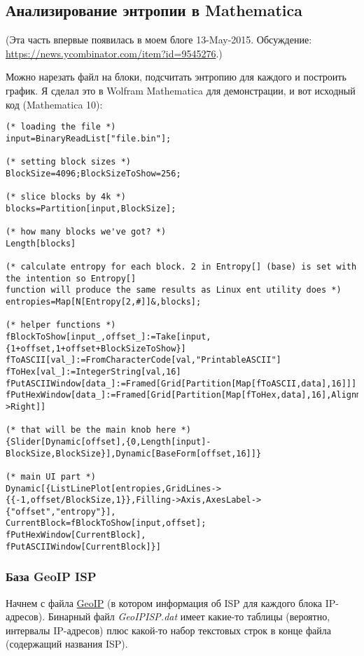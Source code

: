 \subsection{Анализирование энтропии в Mathematica}
\newcommand{\EntropyGfxScale}{0.8\textwidth}

(Эта часть впервые появилась в моем блоге 13-May-2015.
Обсуждение: \url{https://news.ycombinator.com/item?id=9545276}.)

Можно нарезать файл на блоки, подсчитать энтропию для каждого и построить график.
Я сделал это в Wolfram Mathematica для демонстрации, и вот исходный код (Mathematica 10):

\begin{lstlisting}[style=custommath]
(* loading the file *)
input=BinaryReadList["file.bin"];

(* setting block sizes *)
BlockSize=4096;BlockSizeToShow=256;

(* slice blocks by 4k *)
blocks=Partition[input,BlockSize];

(* how many blocks we've got? *)
Length[blocks]

(* calculate entropy for each block. 2 in Entropy[] (base) is set with the intention so Entropy[] 
function will produce the same results as Linux ent utility does *)
entropies=Map[N[Entropy[2,#]]&,blocks];

(* helper functions *)
fBlockToShow[input_,offset_]:=Take[input,{1+offset,1+offset+BlockSizeToShow}]
fToASCII[val_]:=FromCharacterCode[val,"PrintableASCII"]
fToHex[val_]:=IntegerString[val,16]
fPutASCIIWindow[data_]:=Framed[Grid[Partition[Map[fToASCII,data],16]]]
fPutHexWindow[data_]:=Framed[Grid[Partition[Map[fToHex,data],16],Alignment->Right]]

(* that will be the main knob here *)
{Slider[Dynamic[offset],{0,Length[input]-BlockSize,BlockSize}],Dynamic[BaseForm[offset,16]]}

(* main UI part *)
Dynamic[{ListLinePlot[entropies,GridLines->{{-1,offset/BlockSize,1}},Filling->Axis,AxesLabel->{"offset","entropy"}],
CurrentBlock=fBlockToShow[input,offset];
fPutHexWindow[CurrentBlock],
fPutASCIIWindow[CurrentBlock]}]
\end{lstlisting}

\subsubsection{База GeoIP \ac{ISP}}

Начнем с файла \href{https://www.maxmind.com/en/geoip-demo}{GeoIP}
(в котором информация об \ac{ISP} для каждого блока IP-адресов).
Бинарный файл \emph{GeoIPISP.dat} имеет какие-то таблицы (вероятно, интервалы IP-адресов) плюс какой-то набор текстовых строк
в конце файла (содержащий названия \ac{ISP}).

